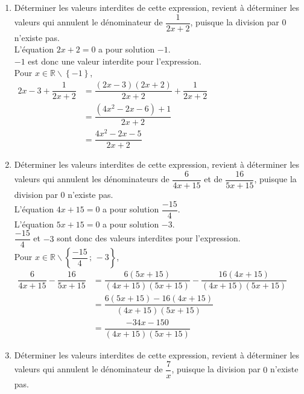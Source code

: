\documentclass[a4paper, french, 12pt]{article}  %
\newcounter{correc}
\newenvironment{corrige}[1]
{\par \bigskip  \noindent \addtocounter{correc}{1} \hrulefill \quad { \large \textbf{Corrigé de l'exercice \thecorrec}} \quad \hrulefill \par \medskip }
{\par \bigskip }
\begin{document}
\begin{corrige}{}

\begin{enumerate}[itemsep=1em]
\item Déterminer les valeurs interdites de cette expression, revient à
            déterminer les valeurs qui annulent le dénominateur de $\dfrac{1}{2x+2}$,
            puisque la division par $0$ n'existe pas.\\L'équation $2x+2=0$ a pour solution $-1$. \\
              $-1$ est donc une valeur interdite pour l'expression. \\
            Pour $x\in \mathbb{R}\smallsetminus\left\{-1\right\}$, \\
            $\begin{aligned}
            2x-3+\dfrac{1}{2x+2}
           & = \dfrac{(2x-3)(2x+2)}{2x+2}+\dfrac{1}{2x+2}\\
            &=\dfrac{(4x^2-2x-6)+1}{2x+2}\\
           & =\dfrac{4x^2-2x-5}{2x+2}
           \end{aligned}$
\item Déterminer les valeurs interdites de cette expression, revient à déterminer les valeurs qui annulent les dénominateurs de $\dfrac{6}{4x+15}$ et de $\dfrac{16}{5x+15}$, puisque la division par $0$ n'existe pas.\\
              L'équation $4x+15=0$ a pour solution $\dfrac{-15}{4}$. \\
            L'équation $5x+15=0$ a pour solution $-3$. \\
            $\dfrac{-15}{4}$ et $-3$ sont donc des valeurs interdites pour l'expression. \\
            Pour $x\in \mathbb{R}\smallsetminus\left\{\dfrac{-15}{4}\,;\,-3\right\}$, \\
            $\begin{aligned}
            \dfrac{6}{4x+15}-\dfrac{16}{5x+15}
            &= \dfrac{6(5x+15)}{(4x+15)(5x+15)}-\dfrac{16(4x+15)}{(4x+15)(5x+15)}\\
            &=\dfrac{6(5x+15)-16(4x+15)}{(4x+15)(5x+15)}\\
            &=\dfrac{-34x-150}{(4x+15)(5x+15)}
            \end{aligned}$
\item Déterminer les valeurs interdites de cette expression, revient à déterminer les valeurs qui annulent le dénominateur de $\dfrac{7}{x}$, puisque la division par $0$ n'existe pas.\\

\end{enumerate}
\end{corrige}
\end{document}
